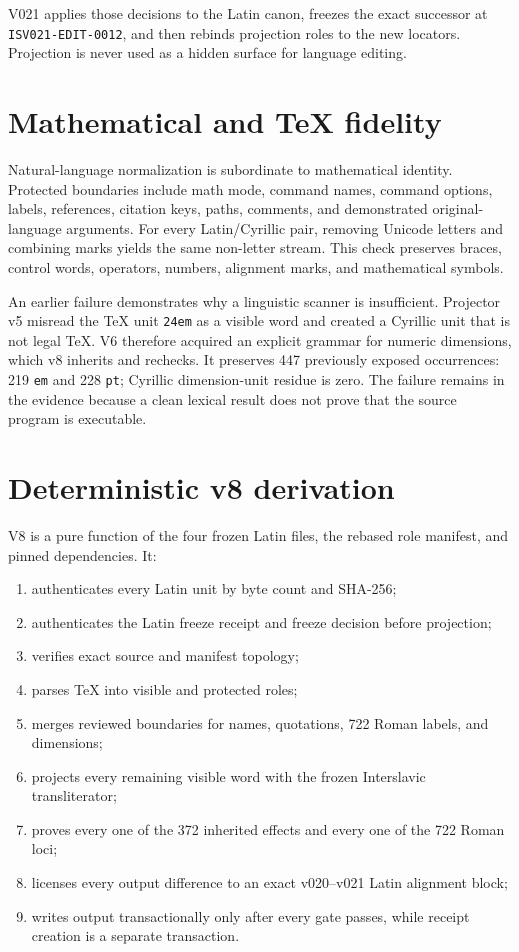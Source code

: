 \documentclass[11pt]{article}
\newcommand{\code}[1]{\texttt{#1}}
\begin{document}
V021 applies those decisions to the Latin canon, freezes the exact successor at \code{ISV021-EDIT-0012}, and then rebinds projection roles to the new locators. Projection is never used as a hidden surface for language editing.

\section{Mathematical and TeX fidelity}

Natural-language normalization is subordinate to mathematical identity. Protected boundaries include math mode, command names, command options, labels, references, citation keys, paths, comments, and demonstrated original-language arguments. For every Latin/Cyrillic pair, removing Unicode letters and combining marks yields the same non-letter stream. This check preserves braces, control words, operators, numbers, alignment marks, and mathematical symbols.

An earlier failure demonstrates why a linguistic scanner is insufficient. Projector v5 misread the TeX unit \code{24em} as a visible word and created a Cyrillic unit that is not legal TeX. V6 therefore acquired an explicit grammar for numeric dimensions, which v8 inherits and rechecks. It preserves 447 previously exposed occurrences: 219 \code{em} and 228 \code{pt}; Cyrillic dimension-unit residue is zero. The failure remains in the evidence because a clean lexical result does not prove that the source program is executable.

\section{Deterministic v8 derivation}

V8 is a pure function of the four frozen Latin files, the rebased role manifest, and pinned dependencies. It:

\begin{enumerate}
\item authenticates every Latin unit by byte count and SHA-256;
\item authenticates the Latin freeze receipt and freeze decision before projection;
\item verifies exact source and manifest topology;
\item parses TeX into visible and protected roles;
\item merges reviewed boundaries for names, quotations, 722 Roman labels, and dimensions;
\item projects every remaining visible word with the frozen Interslavic transliterator;
\item proves every one of the 372 inherited effects and every one of the 722 Roman loci;
\item licenses every output difference to an exact v020--v021 Latin alignment block;
\item writes output transactionally only after every gate passes, while receipt creation is a separate transaction.
\end{enumerate}
\end{document}
